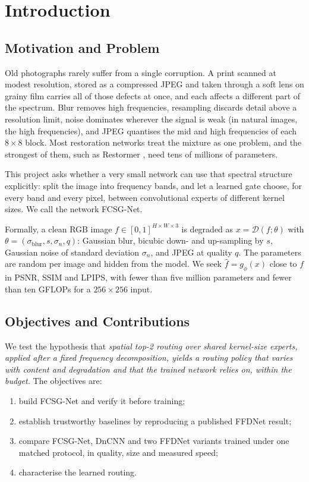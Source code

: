 \documentclass[12pt,a4paper,oneside]{NITR}
\newcommand{\fcsg}{FCSG-Net}
\begin{document}
\chapter{Introduction}\label{ch:intro}

\section{Motivation and Problem}\label{sec:motivation}

Old photographs rarely suffer from a single corruption. A print scanned at
modest resolution, stored as a compressed JPEG and taken through a soft lens
on grainy film carries all of those defects at once, and each affects a
different part of the spectrum. Blur removes high frequencies, resampling
discards detail above a resolution limit, noise dominates wherever the signal
is weak (in natural images, the high frequencies), and JPEG quantises the mid
and high frequencies of each $8\times8$ block. Most restoration networks
treat the mixture as one problem, and the strongest of them, such as
Restormer \cite{zamir2022restormer}, need tens of millions of parameters.

This project asks whether a very small network can use that spectral
structure explicitly: split the image into frequency bands, and let a learned
gate choose, for every band and every pixel, between convolutional experts of
different kernel sizes. We call the network \fcsg{}.

Formally, a clean RGB image $f\in[0,1]^{H\times W\times 3}$ is degraded as
$x=\mathcal{D}(f;\theta)$ with $\theta=(\sigma_\text{blur}, s, \sigma_n, q)$:
Gaussian blur, bicubic down- and up-sampling by $s$, Gaussian noise of
standard deviation $\sigma_n$, and JPEG at quality $q$. The parameters are
random per image and hidden from the model. We seek $\hat f=g_\phi(x)$ close
to $f$ in PSNR, SSIM and LPIPS, with fewer than five million parameters and
fewer than ten GFLOPs for a $256\times256$ input.

\section{Objectives and Contributions}\label{sec:objectives}

We test the hypothesis that \emph{spatial top-2 routing over shared
kernel-size experts, applied after a fixed frequency decomposition, yields a
routing policy that varies with content and degradation and that the trained
network relies on, within the budget.} The objectives are:
\begin{enumerate}
	\item[\textbf{O1}] build \fcsg{} and verify it before training;
	\item[\textbf{O2}] establish trustworthy baselines by reproducing a
	published FFDNet result;
	\item[\textbf{O3}] compare \fcsg{}, DnCNN and two FFDNet variants trained
	under one matched protocol, in quality, size and measured speed;
	\item[\textbf{O4}] characterise the learned routing.
\end{enumerate}
\end{document}
